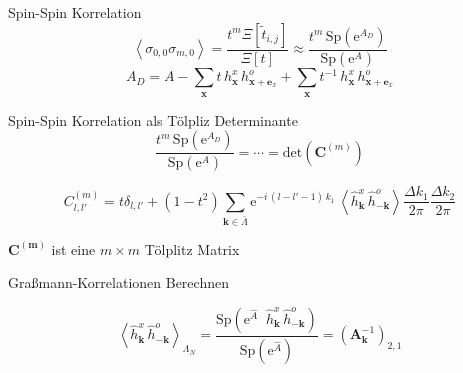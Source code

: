 \documentclass[11pt]{beamer}
\newcommand{\corr}[1]{\left\langle #1 \right\rangle}
\newcommand{\Sp}[1]{\mathrm{Sp}\left( #1 \right)}
\renewcommand{\det}[1]{\mathrm{det}\left( #1 \right)}
\begin{document}
    \begin{frame}{Spin-Spin Korrelation}
    \begin{equation} \nonumber
        \corr{\sigma_{0,0} \sigma_{m,0}}  = \frac{t^m \Xi[\tilde{t}_{i,j}]}{\Xi[t]}  \approx \frac{t^m \, \Sp{\mathrm{e}^{A_D}}}{\Sp{\mathrm{e}^A}} 
    \end{equation}
    \vspace{0.5cm}
    \begin{equation} \nonumber
        A_D = A - \sum_{\bm{x}} t\, h_{\bm{x}}^x\, h_{\bm{x} + \bm{e}_x}^o + \sum_{\bm{x}} t^{-1}\, h_{\bm{x}}^x\, h_{\bm{x} + \bm{e}_x}^o
    \end{equation}
    
    \vspace{0.5cm}

    
    \end{frame}

    \begin{frame}{Spin-Spin Korrelation als Tölpliz Determinante}
        \begin{equation} \nonumber
            \frac{t^m \, \Sp{\mathrm{e}^{A_D}}}{\Sp{\mathrm{e}^A}} = \cdots = \det{\bm{C}^{(m)}} 
        \end{equation}

        \begin{grayframe}
         \vspace{0.2cm}
        \begin{equation} \nonumber
            C_{l,l'}^{(m)} = t \delta_{l,l'} + (1-t^2)\sum_{\bm{k} \in \bar{\Lambda}}  \mathrm{e}^{-i\,(l-l'-1) \,k_1} \,\corr{\hat{h}_{\bm{k}}^{x}\, \hat{h}_{-\bm{k}}^{o}} \frac{\Delta k_1}{2\pi}\frac{\Delta k_2}{2\pi} %
        \end{equation}
        \end{grayframe}
        
        \vspace{0.1cm}
        \vspace{0.5cm}
        \centering
        $\bm{C^{(m)}}$ ist eine $m\times m$ Tölplitz Matrix
    \end{frame}

    \begin{frame}{Graßmann-Korrelationen Berechnen}
    
    \begin{equation} \nonumber
    \corr{\hat{h}_{\bm{k}}^{x}\, \hat{h}_{-\bm{k}}^{o}}_{\Lambda_N} = \frac{\Sp{\mathrm{e}^{\hat{A}}\;\;\hat{h}_{\bm{k}}^{x}\, \hat{h}_{-\bm{k}}^{o}}}{\Sp{\mathrm{e}^{\hat{A}}}} = \left(\bm{A}_{\bm{k}}^{-1}\right)_{2,1} 
    \end{equation} 
    \end{frame}
\end{document}
